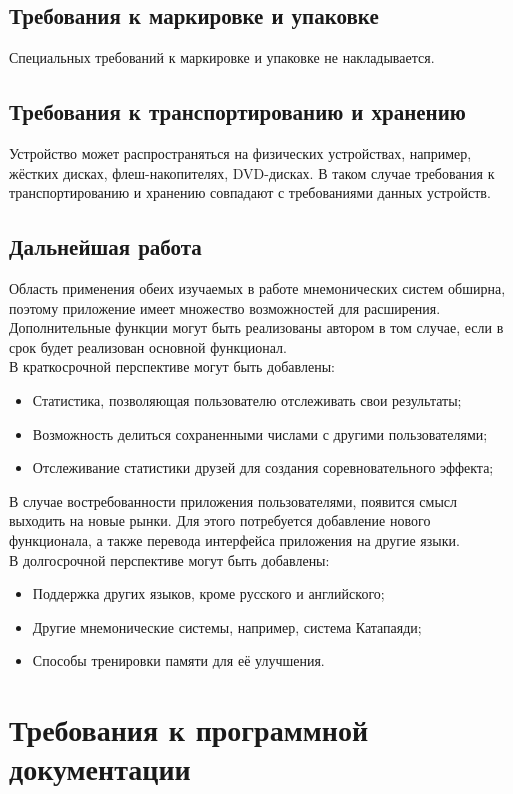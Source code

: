 \documentclass[draft]{article}
\begin{document}
\subsection{Требования к маркировке и упаковке}
Специальных требований к маркировке и упаковке не накладывается.
\subsection{Требования к транспортированию и хранению}
Устройство может распространяться на физических устройствах, например, жёстких дисках, флеш-накопителях, DVD-дисках. В таком случае требования к транспортированию и хранению совпадают с требованиями данных устройств.
\subsection{Дальнейшая работа}
Область применения обеих изучаемых в работе мнемонических систем обширна, поэтому приложение имеет множество возможностей для расширения. Дополнительные функции могут быть реализованы автором в том случае, если в срок будет реализован основной функционал.\\
В краткосрочной перспективе могут быть добавлены:
\begin{itemize}
\item Статистика, позволяющая пользователю отслеживать свои результаты;
\item Возможность делиться сохраненными числами с другими пользователями;
\item Отслеживание статистики друзей для создания соревновательного эффекта;
\end{itemize}
В случае востребованности приложения пользователями, появится смысл выходить на новые рынки. Для этого потребуется добавление нового функционала, а также перевода интерфейса приложения на другие языки.\\
В долгосрочной перспективе могут быть добавлены: 
\begin{itemize}
\item Поддержка других языков, кроме русского и английского;
\item Другие мнемонические системы, например, система Катапаяди;
\item Способы тренировки памяти для её улучшения.
\end{itemize}
\newpage
\section {Требования к программной документации}
\end{document}
